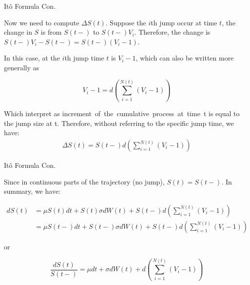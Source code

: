 \documentclass{beamer}
\begin{document}
 \begin{frame}{Itô Formula Con.}

    {\footnotesize \footnotesize
    \par Now we need to compute \(\Delta S(t)\). Suppose the \(i\)th jump occur at time \(t\), 
        the change in \(S\) is from \(S(t-)\) to \(S(t-)V_i\).
     Therefore, the change is \(S(t-)V_i - S(t-) = S(t-)(V_i - 1)\). 
     \par In this case, at the \(i\)th jump time \(t\) is \(V_i - 1\), which can also be written more generally as

    \[
    V_i - 1 = d \left( \sum_{i=1}^{N(t)} (V_i - 1) \right)
    \]
    \vspace{1em}
    \par Which interpret as increment of the cumulative process at time t is equal to the jump size at t. 
    Therefore, without referring to the specific jump time, we have: 
    \begin{align*}
        \Delta S(t) = S(t-)d \left( \sum_{i=1}^{N(t)} (V_i - 1) \right)
    \end{align*}
    }
    
\end{frame}

\begin{frame}{Itô Formula Con.}

    {\footnotesize \footnotesize
    \par Since in continuous parts of the trajectory (no jump), $S(t) = S(t-)$. In summary, we have: 

    \[
    \begin{aligned}
    dS(t) &= \mu S(t)dt + S(t)\sigma dW(t) + S(t-)d \left( \sum_{i=1}^{N(t)} (V_i - 1) \right) \\
    &= \mu S(t-)dt + S(t-)\sigma dW(t) + S(t-)d \left( \sum_{i=1}^{N(t)} (V_i - 1) \right)
    \end{aligned}
    \]

    \par or

    \[
    \frac{dS(t)}{S(t-)} = \mu dt + \sigma dW(t) + d \left( \sum_{i=1}^{N(t)} (V_i - 1) \right)
    \]
    }
    
\end{frame}
\end{document}
